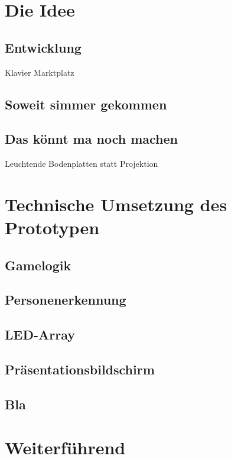 






\tableofcontents
\clearpage


\section{Die Idee}
\subsection{Entwicklung}
Klavier Marktplatz
\subsection{Soweit simmer gekommen}
\subsection{Das könnt ma noch machen}
Leuchtende Bodenplatten statt Projektion

\section{Technische Umsetzung des Prototypen}
\subsection{Gamelogik}
\subsection{Personenerkennung}
\subsection{LED-Array}
\subsection{Präsentationsbildschirm}
\subsection{Bla}

\section{Weiterführend}


